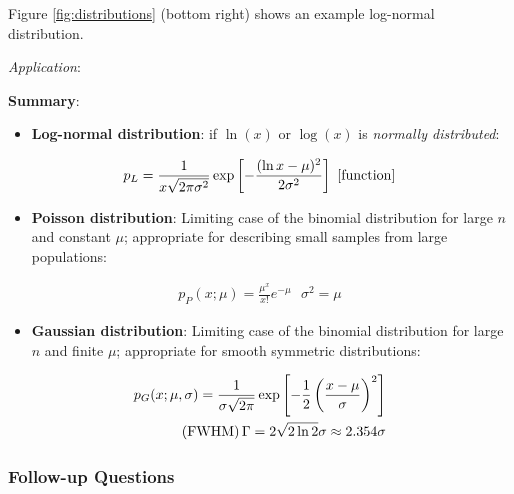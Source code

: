 \documentclass[a4paper,10pt]{article}
\begin{document}
{\noindent}Figure \ref{fig:distributions} (bottom right) shows an example log-normal distribution.

{\noindent}\textit{Application}:

{\noindent}\textbf{Summary}:

\begin{itemize}
    \item \textbf{Log-normal distribution}: if $\ln(x)$ or $\log(x)$ is \textit{normally distributed}:
\end{itemize}

\begin{align*}
    p_L = \frac{1}{x\sqrt{2\pi\sigma^2}} \exp \left[-\frac{(\ln x-\mu)^2}{2\sigma^2}\right] ~ [{\rm function}]
\end{align*}

\begin{itemize}
    \item \textbf{Poisson distribution}: Limiting case of the binomial distribution for large $n$ and constant $\mu$; appropriate for describing small samples from large populations:
\end{itemize}

\begin{align*}
    p_P(x;\mu) = \frac{\mu^x}{x!}e^{-\mu}  ~~~ \sigma^2=\mu
\end{align*}

\begin{itemize}
    \item \textbf{Gaussian distribution}: Limiting case of the binomial distribution for large $n$ and finite $\mu$; appropriate for smooth symmetric distributions:
\end{itemize}

\begin{align*}
    p_G(x;\mu,\sigma) = \frac{1}{\sigma\sqrt{2\pi}} \exp \left[-\frac{1}{2}\left(\frac{x-\mu}{\sigma}\right)^2\right] \\
    {\rm (FWHM)}\,\Gamma=2\sqrt{2\ln2}\sigma \approx 2.354\sigma
\end{align*}

\subsubsection{Follow-up Questions}
\end{document}
